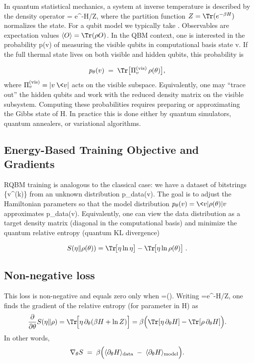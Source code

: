 \documentclass[%
oneside,                 %
final,                   %
10pt]{article}
\begin{document}
In quantum statistical mechanics, a system at inverse temperature
\beta is described by the density operator \rho = e^{-\beta H}/Z,
where the partition function \(Z = \Tr(e^{-\beta H})\) normalizes the
state.  For a qubit model we typically take .  Observables are
expectation values \(\langle O\rangle = \Tr(\rho O)\). In the QBM
context, one is interested in the probability p(v) of measuring the
visible qubits in computational basis state v.  If the full thermal
state lives on both visible and hidden qubits, this probability is

\[
p_\theta(v) \;=\; \Tr\bigl[\Pi_v^{(\text{vis})}\,\rho(\theta)\bigr],
\]
where \(\Pi_v^{(\text{vis})}=|v\>\<v|\) acts on the visible subspace.
Equivalently, one may “trace out” the hidden qubits and work with the
reduced density matrix on the visible subsystem.  Computing these
probabilities requires preparing or approximating the Gibbs state of
H.  In practice this is done either by quantum simulators, quantum
annealers, or variational algorithms.

\subsection*{Energy-Based Training Objective and Gradients}

RQBM training is analogous to the classical case: we have a dataset of
bitstrings \{v^{(k)}\} from an unknown distribution p_{\rm data}(v).
The goal is to adjust the Hamiltonian parameters \theta so that the
model distribution \(p_\theta(v)=\<v|\rho(\theta)|v\>\) approximates
p_{\rm data}(v).  Equivalently, one can view the data distribution as
a target density matrix \eta (diagonal in the computational basis) and
minimize the quantum relative entropy (quantum KL divergence)

\[
S(\eta\Vert \rho(\theta)) = \Tr\!\bigl[\eta\ln\eta\bigr] - \Tr\!\bigl[\eta\ln\rho(\theta)\bigr] \;.
\]

\subsection*{Non-negative loss}
This loss is non-negative and equals zero only when \eta=\rho(\theta).
Writing \rho=e^{-H}/Z, one finds the gradient of the relative entropy
(for parameter \theta in H) as
\[
\frac{\partial}{\partial\theta} S(\eta\Vert\rho)
= \Tr\!\Bigl[\eta\,\partial_\theta(\beta H + \ln Z)\Bigr]
= \beta\Bigl(\Tr[\eta\,\partial_\theta H] - \Tr[\rho\,\partial_\theta H]\Bigr).
\]
In other words,
\[
\nabla_\theta S \;=\; \beta\Bigl(\langle \partial_\theta H\rangle_{\rm data} \;-\; \langle \partial_\theta H\rangle_{\rm model}\Bigr).
\]
\end{document}

